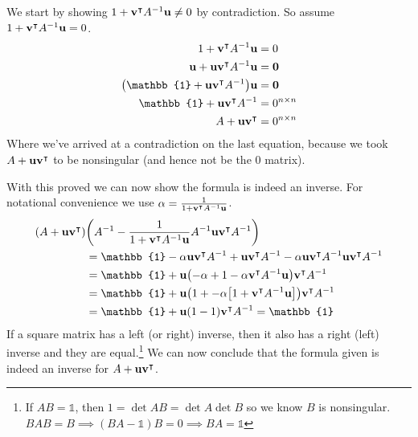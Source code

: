 \documentclass[boxes,pages]{homework}
\newcommand{\tpose}[1]{#1^\intercal}
\newcommand{\inv}[1]{#1^{-1}}
\begin{document}
\begin{solution}
	We start by showing $1 + \tpose{\vb{v}}\inv{A}\vb{u} \neq 0$ by contradiction. So assume $1 + \tpose{\vb{v}}\inv{A}\vb{u} = 0$.
	\begin{align*}
		1 + \tpose{\vb{v}}\inv{A}\vb{u}                      & = 0             \\
		\vb{u} + \vb{u}\tpose{\vb{v}}\inv{A}\vb{u}           & = \vb{0}        \\
		\qty(\mathbb{1} + \vb{u}\tpose{\vb{v}}\inv{A})\vb{u} & = \vb{0}        \\
		\mathbb{1} + \vb{u}\tpose{\vb{v}}\inv{A}             & = 0^{n\times n} \\
		A + \vb{u}\tpose{\vb{v}}                             & = 0^{n\times n}
	\end{align*}
	Where we've arrived at a contradiction on the last equation, because we took $A + \vb{u}\tpose{\vb{v}}$ to be nonsingular (and hence not be the 0 matrix).

	With this proved we can now show the formula is indeed an inverse. For notational convenience we use $\alpha = \frac{1}{1 + \tpose{\vb{v}}\inv{A}\vb{u}}$.
	\begin{align*}
		\qty(A + \vb{u}\tpose{\vb{v}}) & \qty(\inv{A} - \frac{1}{1 + \tpose{\vb{v}}\inv{A}\vb{u}}\inv{A}\vb{u}\tpose{\vb{v}}\inv{A})                                                    \\
		                               & = \mathbb{1} - \alpha\vb{u}\tpose{\vb{v}}\inv{A} + \vb{u}\tpose{\vb{v}}\inv{A} - \alpha \vb{u}\tpose{\vb{v}}\inv{A}\vb{u}\tpose{\vb{v}}\inv{A} \\
		                               & = \mathbb{1} + \vb{u}\qty(-\alpha + 1 - \alpha\tpose{\vb{v}}\inv{A}\vb{u})\tpose{\vb{v}}\inv{A}                                                \\
		                               & = \mathbb{1} + \vb{u}\qty(1 + -\alpha\qty[1 + \tpose{\vb{v}}\inv{A}\vb{u}])\tpose{\vb{v}}\inv{A}                                               \\
		                               & = \mathbb{1} + \vb{u}\qty(1 - 1)\tpose{\vb{v}}\inv{A} = \mathbb{1}
	\end{align*}
	If a square matrix has a left (or right) inverse, then it also has a right (left) inverse and they are equal.\footnote{If $AB = \mathbb{1}$, then $1 = \det AB = \det A\det B$ so we know $B$ is nonsingular. $BAB = B \implies (BA - \mathbb{1})B = 0 \implies BA = \mathbb{1}$} We can now conclude that the formula given is indeed an inverse for $A + \vb{u}\tpose{\vb{v}}$.
\end{solution}
\end{document}
